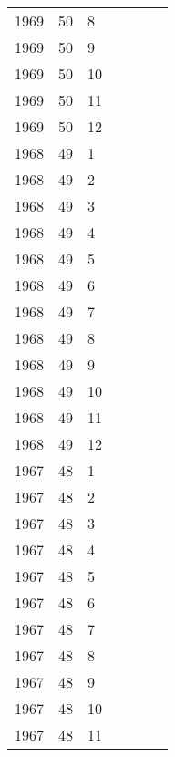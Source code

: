 \begin{longtable}{ |l|l|l|l|p{2.7cm}|l|p{2cm}| }
 1969 & 50 &     8 &         &                &  & \\
 1969 & 50 &     9 &         &                &  & \\
 1969 & 50 &    10 &         &                &  & \\
 1969 & 50 &    11 &         &                &  & \\
 1969 & 50 &    12 &         &                &  & \\
 1968 & 49 &     1 &         &                &  & \\
 1968 & 49 &     2 &         &                &  & \\
 1968 & 49 &     3 &         &                &  & \\
 1968 & 49 &     4 &         &                &  & \\
 1968 & 49 &     5 &         &                &  & \\
 1968 & 49 &     6 &         &                &  & \\
 1968 & 49 &     7 &         &                &  & \\
 1968 & 49 &     8 &         &                &  & \\
 1968 & 49 &     9 &         &                &  & \\
 1968 & 49 &    10 &         &                &  & \\
 1968 & 49 &    11 &         &                &  & \\
 1968 & 49 &    12 &         &                &  & \\
 1967 & 48 &     1 &         &                &  & \\
 1967 & 48 &     2 &         &                &  & \\
 1967 & 48 &     3 &         &                &  & \\
 1967 & 48 &     4 &         &                &  & \\
 1967 & 48 &     5 &         &                &  & \\
 1967 & 48 &     6 &         &                &  & \\
 1967 & 48 &     7 &         &                &  & \\
 1967 & 48 &     8 &         &                &  & \\
 1967 & 48 &     9 &         &                &  & \\
 1967 & 48 &    10 &         &                &  & \\
 1967 & 48 &    11 &         &                &  & \\

\end{longtable}
